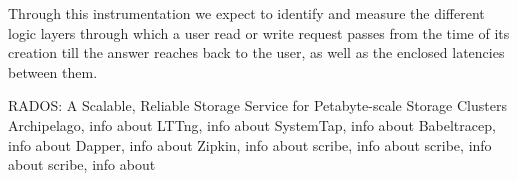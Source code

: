\documentclass[a4paper,12pt]{article}
\begin{document}
Through this instrumentation we expect to identify and measure the different 
logic layers through which a user read or write request passes from the time of
its creation till the answer reaches back to the user, as well as the enclosed 
latencies between them.

\begin{thebibliography}{9}
    RADOS: A Scalable, Reliable Storage Service for Petabyte-scale
    Storage Clusters
    Archipelago,
    info about
    LTTng,
    info about
    SystemTap,
    info about
    Babeltracep,
    info about
    Dapper,
    info about
    Zipkin,
   info about
    scribe,
   info about
    scribe,
   info about
    scribe,
   info about
\end{thebibliography}
\end{document}
